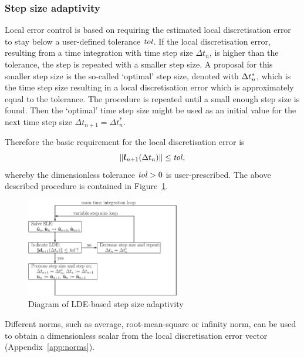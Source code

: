\subsubsection{Step size adaptivity} \label{sec:adaptivity}
Local error control is based on requiring the estimated local
discretisation error to stay below a user-defined tolerance
$\mathit{tol}$\@. If the local discretisation error, resulting from a time integration with time
step size $\Delta t_n$, is higher than the tolerance, the step is
repeated with a smaller step size. A proposal for this smaller step size is the so-called `optimal' step size, denoted with $\Delta t_n^*$, which
is the time step size resulting in a local discretisation error which is approximately equal to the
tolerance. The procedure is repeated until a small enough step size is
found. Then the `optimal' time step size might be used as an initial value
for the next time step size $\Delta t_{n+1} = \Delta t_n^*$\@. 

Therefore the basic requirement for the local discretisation error is
\begin{equation} \label{eq:lde-leq-tol}
  \|\boldsymbol{l}_{n+1}(\Delta t_n)\| \leq \mathit{tol}
  \text{,}
\end{equation}
whereby the dimensionless tolerance $\mathit{tol}>0$ is user-prescribed. The above
described procedure is contained in 
Figure~\ref{fig:adap-sch}\@. 
\begin{figure}[ht!]
\begin{center}
\includegraphics[width=0.6\textwidth]{gfx/adap-sch}
\caption{Diagram of LDE-based step size adaptivity}
\label{fig:adap-sch}
\end{center}
\end{figure}
Different norms, such as 
average, root-mean-square or infinity norm, can be used to obtain a
dimensionless scalar from the local discretisation error vector
(Appendix~\ref{app:norms})\@. 

